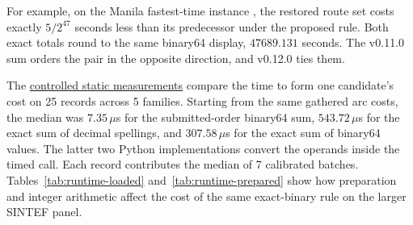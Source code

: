 For example, on the Manila fastest-time instance , the restored route set costs exactly $5/2^{47}$ seconds less than its predecessor under the proposed rule. Both exact totals round to the same binary64 display, $47689.131$ seconds. The v0.11.0 sum orders the pair in the opposite direction, and v0.12.0 ties them.

The \href{https://github.com/0nyr/routing-numerical-contracts/blob/75905c8827f959621ea808894e28136d248d2d15/results/controlled-static.json}{controlled static measurements} compare the time to form one candidate's cost on 25 records across 5 families. Starting from the same gathered arc costs, the median was $7.35\,\mu$s for the submitted-order binary64 sum, $543.72\,\mu$s for the exact sum of decimal spellings, and $307.58\,\mu$s for the exact sum of binary64 values. The latter two Python implementations convert the operands inside the timed call. Each record contributes the median of 7 calibrated batches. Tables~\ref{tab:runtime-loaded} and~\ref{tab:runtime-prepared} show how preparation and integer arithmetic affect the cost of the same exact-binary rule on the larger SINTEF panel.
